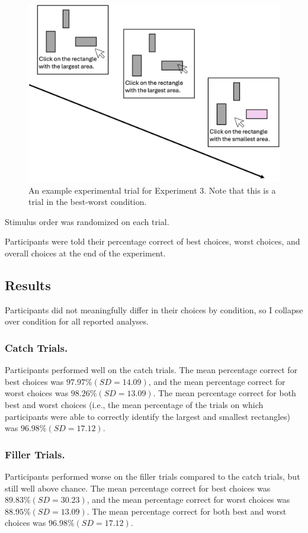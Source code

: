 {{{{\begin{figure}
   \includegraphics[width=\linewidth]{figures/bw_design_fig.jpg}
   \caption{An example experimental trial for Experiment 3. Note that this is a trial in the best-worst condition.}
   \label{fig:bw_example_trial}
 \end{figure}
 

Stimulus order was randomized on each trial. 

Participants were told their percentage correct of best choices, worst choices, and overall choices at the end of the experiment.

\subsection{Results}

Participants did not meaningfully differ in their choices by condition, so I collapse over condition for all reported analyses.

\subsubsection{Catch Trials.}
Participants performed well on the catch trials. The mean percentage correct for best choices was $97.97\% (SD=14.09)$, and the mean percentage correct for worst choices was $98.26\% (SD=13.09)$. The mean percentage correct for both best and worst choices (i.e., the mean percentage of the trials on which participants were able to correctly identify the largest and smallest rectangles) was $96.98\% (SD=17.12)$. 

\subsubsection{Filler Trials.}
Participants performed worse on the filler trials compared to the catch trials, but still well above chance. The mean percentage correct for best choices was $89.83\% (SD=30.23)$, and the mean percentage correct for worst choices was $88.95\% (SD=13.09)$. The mean percentage correct for both best and worst choices was $96.98\% (SD=17.12)$. 

}}}}
